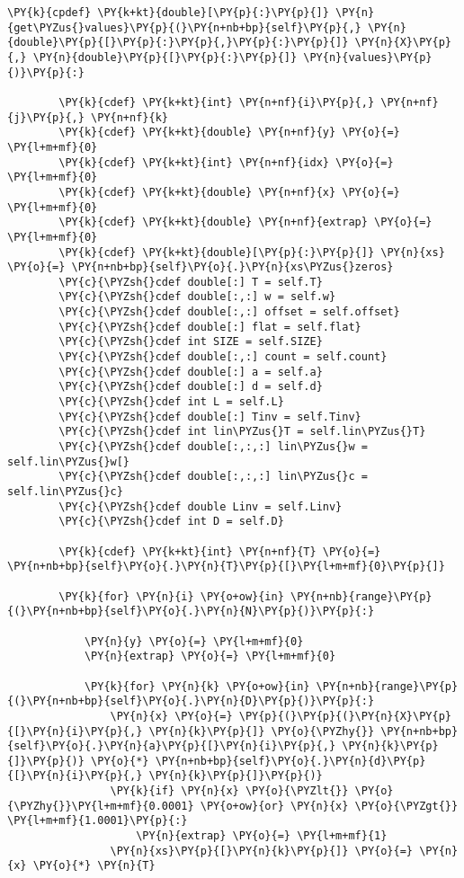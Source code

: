 \begin{Verbatim}[commandchars=\\\{\}]
    \PY{k}{cpdef} \PY{k+kt}{double}[\PY{p}{:}\PY{p}{]} \PY{n}{get\PYZus{}values}\PY{p}{(}\PY{n+nb+bp}{self}\PY{p}{,} \PY{n}{double}\PY{p}{[}\PY{p}{:}\PY{p}{,}\PY{p}{:}\PY{p}{]} \PY{n}{X}\PY{p}{,} \PY{n}{double}\PY{p}{[}\PY{p}{:}\PY{p}{]} \PY{n}{values}\PY{p}{)}\PY{p}{:}

        \PY{k}{cdef} \PY{k+kt}{int} \PY{n+nf}{i}\PY{p}{,} \PY{n+nf}{j}\PY{p}{,} \PY{n+nf}{k}
        \PY{k}{cdef} \PY{k+kt}{double} \PY{n+nf}{y} \PY{o}{=} \PY{l+m+mf}{0}
        \PY{k}{cdef} \PY{k+kt}{int} \PY{n+nf}{idx} \PY{o}{=} \PY{l+m+mf}{0}
        \PY{k}{cdef} \PY{k+kt}{double} \PY{n+nf}{x} \PY{o}{=} \PY{l+m+mf}{0}
        \PY{k}{cdef} \PY{k+kt}{double} \PY{n+nf}{extrap} \PY{o}{=} \PY{l+m+mf}{0}
        \PY{k}{cdef} \PY{k+kt}{double}[\PY{p}{:}\PY{p}{]} \PY{n}{xs} \PY{o}{=} \PY{n+nb+bp}{self}\PY{o}{.}\PY{n}{xs\PYZus{}zeros}
        \PY{c}{\PYZsh{}cdef double[:] T = self.T}
        \PY{c}{\PYZsh{}cdef double[:,:] w = self.w}
        \PY{c}{\PYZsh{}cdef double[:,:] offset = self.offset}
        \PY{c}{\PYZsh{}cdef double[:] flat = self.flat}
        \PY{c}{\PYZsh{}cdef int SIZE = self.SIZE}
        \PY{c}{\PYZsh{}cdef double[:,:] count = self.count}
        \PY{c}{\PYZsh{}cdef double[:] a = self.a}
        \PY{c}{\PYZsh{}cdef double[:] d = self.d}
        \PY{c}{\PYZsh{}cdef int L = self.L}
        \PY{c}{\PYZsh{}cdef double[:] Tinv = self.Tinv}
        \PY{c}{\PYZsh{}cdef int lin\PYZus{}T = self.lin\PYZus{}T}
        \PY{c}{\PYZsh{}cdef double[:,:,:] lin\PYZus{}w = self.lin\PYZus{}w[}
        \PY{c}{\PYZsh{}cdef double[:,:,:] lin\PYZus{}c = self.lin\PYZus{}c}
        \PY{c}{\PYZsh{}cdef double Linv = self.Linv}
        \PY{c}{\PYZsh{}cdef int D = self.D}

        \PY{k}{cdef} \PY{k+kt}{int} \PY{n+nf}{T} \PY{o}{=} \PY{n+nb+bp}{self}\PY{o}{.}\PY{n}{T}\PY{p}{[}\PY{l+m+mf}{0}\PY{p}{]}

        \PY{k}{for} \PY{n}{i} \PY{o+ow}{in} \PY{n+nb}{range}\PY{p}{(}\PY{n+nb+bp}{self}\PY{o}{.}\PY{n}{N}\PY{p}{)}\PY{p}{:}
            
            \PY{n}{y} \PY{o}{=} \PY{l+m+mf}{0}
            \PY{n}{extrap} \PY{o}{=} \PY{l+m+mf}{0}
            
            \PY{k}{for} \PY{n}{k} \PY{o+ow}{in} \PY{n+nb}{range}\PY{p}{(}\PY{n+nb+bp}{self}\PY{o}{.}\PY{n}{D}\PY{p}{)}\PY{p}{:}
                \PY{n}{x} \PY{o}{=} \PY{p}{(}\PY{p}{(}\PY{n}{X}\PY{p}{[}\PY{n}{i}\PY{p}{,} \PY{n}{k}\PY{p}{]} \PY{o}{\PYZhy{}} \PY{n+nb+bp}{self}\PY{o}{.}\PY{n}{a}\PY{p}{[}\PY{n}{i}\PY{p}{,} \PY{n}{k}\PY{p}{]}\PY{p}{)} \PY{o}{*} \PY{n+nb+bp}{self}\PY{o}{.}\PY{n}{d}\PY{p}{[}\PY{n}{i}\PY{p}{,} \PY{n}{k}\PY{p}{]}\PY{p}{)} 
                \PY{k}{if} \PY{n}{x} \PY{o}{\PYZlt{}} \PY{o}{\PYZhy{}}\PY{l+m+mf}{0.0001} \PY{o+ow}{or} \PY{n}{x} \PY{o}{\PYZgt{}} \PY{l+m+mf}{1.0001}\PY{p}{:}
                    \PY{n}{extrap} \PY{o}{=} \PY{l+m+mf}{1}
                \PY{n}{xs}\PY{p}{[}\PY{n}{k}\PY{p}{]} \PY{o}{=} \PY{n}{x} \PY{o}{*} \PY{n}{T}
            

\end{Verbatim}
